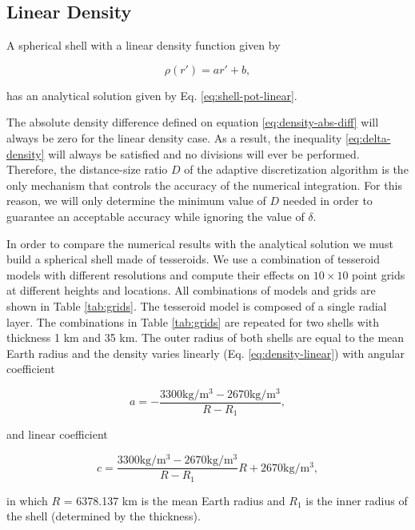 \documentclass[extra]{gji}
\begin{document}
\subsection{Linear Density}

A spherical shell with a linear density function given by

\begin{equation}
    \rho(r') = ar' + b,
    \label{eq:density-linear}
\end{equation}

\noindent
has an analytical solution given by Eq. \ref{eq:shell-pot-linear}.

The absolute density difference defined on equation
\ref{eq:density-abs-diff} will always be zero for the linear density case.
As a result, the inequality \ref{eq:delta-density} will always be satisfied and no
divisions will ever be performed.
Therefore, the distance-size ratio $D$ of the adaptive discretization algorithm is the
only mechanism that controls the accuracy of the numerical integration.
For this reason, we will only determine the minimum value of $D$ needed in order to
guarantee an acceptable accuracy while ignoring the value of $\delta$.

In order to compare the numerical results with the analytical solution we
must build a spherical shell made of tesseroids.
We use a combination of tesseroid models with different resolutions and compute their
effects on $10 \times 10$ point grids at different heights and locations.
All combinations of models and grids are shown in Table \ref{tab:grids}.
The tesseroid model is composed of a single radial layer.
The combinations in Table \ref{tab:grids} are repeated for two shells with thickness 1
km and 35 km.
The outer radius of both shells are equal to the mean Earth radius and
the density varies linearly (Eq. \ref{eq:density-linear})
with angular coefficient

\begin{equation}
    a = -\frac{3300\text{kg/m$^3$} - 2670\text{kg/m$^3$}}{R - R_1},
\end{equation}

\noindent and linear coefficient

\begin{equation}
    c = \frac{3300\text{kg/m$^3$} -
        2670\text{kg/m$^3$}}{R - R_1} R +
        2670\text{kg/m$^3$},
\end{equation}

\noindent
in which $R$ = 6378.137 km is the mean Earth radius and $R_1$ is the inner radius of the
shell (determined by the thickness).
\end{document}
